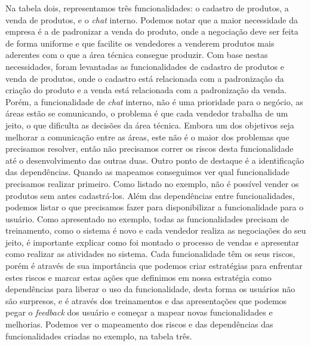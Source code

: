       Na tabela dois, representamos três funcionalidades: o cadastro de produtos,
      a venda de produtos, e o \textit{chat} interno. Podemos notar que a maior necessidade
      da empresa é a de padronizar a venda do produto, onde a negociação deve ser
      feita de forma uniforme e que facilite os vendedores a venderem produtos
      mais aderentes com o que a área técnica consegue produzir. Com base nestas
      necessidades, foram levantadas as funcionalidades de cadastro de produtos e
      venda de produtos, onde o cadastro está relacionada com a padronização da
      criação do produto e a venda está relacionada com a padronização da venda.
      Porém, a funcionalidade de \textit{chat} interno, não é uma prioridade para
      o negócio, as áreas estão se comunicando, o problema é que cada vendedor
      trabalha de um jeito, o que dificulta as decisões da área técnica. Embora um
      dos objetivos seja melhorar a comunicação entre as áreas, este não é o maior
      dos problemas que precisamos resolver, então não precisamos correr os riscos
      desta funcionalidade até o desenvolvimento das outras duas. \newline
      Outro ponto de destaque é a identificação das dependências. Quando as mapeamos
      conseguimos ver qual funcionalidade precisamos realizar primeiro. Como
      listado no exemplo, não é possível vender os produtos sem antes cadastrá-los.
      Além das dependências entre funcionalidades, podemos listar o que precisamos
      fazer para disponibilizar a funcionalidade para o usuário. Como apresentado
      no exemplo, todas as funcionalidades precisam de treinamento, como o sistema
      é novo e cada vendedor realiza as negociações do seu jeito, é importante
      explicar como foi montado o processo de vendas e apresentar como realizar
      as atividades no sistema. \newline
      Cada funcionalidade têm os seus riscos, porém é através de sua importância que
      podemos criar estratégias para enfrentar estes riscos e marcar estas ações
      que definimos em nossa estratégia como dependências para liberar o uso da
      funcionalidade, desta forma os usuários não são surpresos, e é através dos
      treinamentos e das apresentações que podemos pegar o \textit{feedback} dos
      usuário e começar a mapear novas funcionalidades e melhorias. Podemos ver
      o mapeamento dos riscos e das dependências das funcionalidades criadas no
      exemplo, na tabela três. \newline

